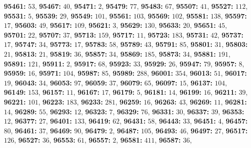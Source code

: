 \textsf{\bfseries 95461:} $53$, \textsf{\bfseries 95467:} $40$, \textsf{\bfseries 95471:} $2$, \textsf{\bfseries 95479:} $77$, \textsf{\bfseries 95483:} $67$, \textsf{\bfseries 95507:} $41$, \textsf{\bfseries 95527:} $112$, \textsf{\bfseries 95531:} $5$, \textsf{\bfseries 95539:} $29$, \textsf{\bfseries 95549:} $101$, \textsf{\bfseries 95561:} $103$, \textsf{\bfseries 95569:} $102$, \textsf{\bfseries 95581:} $138$, \textsf{\bfseries 95597:} $17$, \textsf{\bfseries 95603:} $49$, \textsf{\bfseries 95617:} $109$, \textsf{\bfseries 95621:} $3$, \textsf{\bfseries 95629:} $130$, \textsf{\bfseries 95633:} $20$, \textsf{\bfseries 95651:} $45$, \textsf{\bfseries 95701:} $22$, \textsf{\bfseries 95707:} $37$, \textsf{\bfseries 95713:} $159$, \textsf{\bfseries 95717:} $11$, \textsf{\bfseries 95723:} $183$, \textsf{\bfseries 95731:} $42$, \textsf{\bfseries 95737:} $17$, \textsf{\bfseries 95747:} $34$, \textsf{\bfseries 95773:} $17$, \textsf{\bfseries 95783:} $58$, \textsf{\bfseries 95789:} $43$, \textsf{\bfseries 95791:} $85$, \textsf{\bfseries 95801:} $31$, \textsf{\bfseries 95803:} $21$, \textsf{\bfseries 95813:} $21$, \textsf{\bfseries 95819:} $36$, \textsf{\bfseries 95857:} $34$, \textsf{\bfseries 95869:} $185$, \textsf{\bfseries 95873:} $34$, \textsf{\bfseries 95881:} $191$, \textsf{\bfseries 95891:} $121$, \textsf{\bfseries 95911:} $2$, \textsf{\bfseries 95917:} $68$, \textsf{\bfseries 95923:} $33$, \textsf{\bfseries 95929:} $26$, \textsf{\bfseries 95947:} $79$, \textsf{\bfseries 95957:} $8$, \textsf{\bfseries 95959:} $16$, \textsf{\bfseries 95971:} $104$, \textsf{\bfseries 95987:} $85$, \textsf{\bfseries 95989:} $288$, \textsf{\bfseries 96001:} $354$, \textsf{\bfseries 96013:} $51$, \textsf{\bfseries 96017:} $19$, \textsf{\bfseries 96043:} $34$, \textsf{\bfseries 96053:} $97$, \textsf{\bfseries 96059:} $37$, \textsf{\bfseries 96079:} $65$, \textsf{\bfseries 96097:} $15$, \textsf{\bfseries 96137:} $104$, \textsf{\bfseries 96149:} $153$, \textsf{\bfseries 96157:} $11$, \textsf{\bfseries 96167:} $17$, \textsf{\bfseries 96179:} $5$, \textsf{\bfseries 96181:} $14$, \textsf{\bfseries 96199:} $16$, \textsf{\bfseries 96211:} $39$, \textsf{\bfseries 96221:} $101$, \textsf{\bfseries 96223:} $183$, \textsf{\bfseries 96233:} $281$, \textsf{\bfseries 96259:} $16$, \textsf{\bfseries 96263:} $43$, \textsf{\bfseries 96269:} $11$, \textsf{\bfseries 96281:} $14$, \textsf{\bfseries 96289:} $55$, \textsf{\bfseries 96293:} $12$, \textsf{\bfseries 96323:} $7$, \textsf{\bfseries 96329:} $76$, \textsf{\bfseries 96331:} $30$, \textsf{\bfseries 96337:} $39$, \textsf{\bfseries 96353:} $12$, \textsf{\bfseries 96377:} $27$, \textsf{\bfseries 96401:} $133$, \textsf{\bfseries 96419:} $62$, \textsf{\bfseries 96431:} $58$, \textsf{\bfseries 96443:} $33$, \textsf{\bfseries 96451:} $4$, \textsf{\bfseries 96457:} $80$, \textsf{\bfseries 96461:} $37$, \textsf{\bfseries 96469:} $90$, \textsf{\bfseries 96479:} $2$, \textsf{\bfseries 96487:} $105$, \textsf{\bfseries 96493:} $46$, \textsf{\bfseries 96497:} $27$, \textsf{\bfseries 96517:} $126$, \textsf{\bfseries 96527:} $36$, \textsf{\bfseries 96553:} $61$, \textsf{\bfseries 96557:} $2$, \textsf{\bfseries 96581:} $411$, \textsf{\bfseries 96587:} $36$, 

